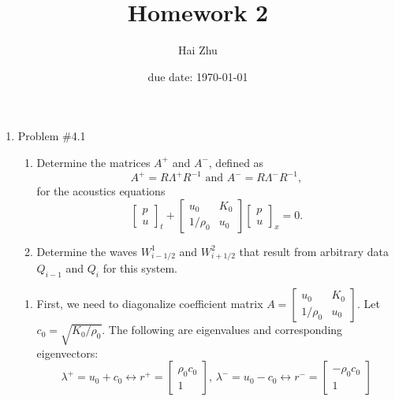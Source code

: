 \documentclass[11pt]{article}
\begin{document}
\title{\Large\bf Homework 2}
\author{Hai Zhu}
\date{due date: \today}
\maketitle
\thispagestyle{fancy}
\renewcommand{\qed}{\hfill \mbox{\raggedright \rule{0.07in}{0.1in}}} %

\begin{enumerate}
    \item Problem \#4.1 
            
			\begin{enumerate}
			
				\item
					Determine the matrices $A^+$ and $A^-$, defined as
					\[
					A^+=R\Lambda^+R^{-1} \text{  and  } 
					A^-=R\Lambda^-R^{-1},
					\]
					for the acoustics equations
					\[
					\begin{bmatrix}
					p\\u
					\end{bmatrix}_t+
					\begin{bmatrix}
					u_0&K_0 \\ 1/\rho_0&u_0
					\end{bmatrix}
					\begin{bmatrix}
					p\\u
					\end{bmatrix}_x=0.
					\]
					
				\item	
					Determine the waves $W_{i-1/2}^1$ and $W_{i+1/2}^2$ that result from arbitrary data $Q_{i-1}$ and $Q_i$ for this system.			

			\end{enumerate}
		
		\vskip 5pt
        \vskip 5pt
        	
        	\begin{enumerate}
        	
				\item
					First, we need to diagonalize coefficient matrix $A=\begin{bmatrix}u_0&K_0\\1/\rho_0&u_0\end{bmatrix}$. Let $c_0=\sqrt{K_0/\rho_0}$. The following are eigenvalues and corresponding eigenvectors:
					\[
					\lambda^+=u_0+c_0 \leftrightarrow 
					r^+=\begin{bmatrix}\rho_0c_0\\1\end{bmatrix} \text{,   } 
					\lambda^-=u_0-c_0 \leftrightarrow 
					r^-=\begin{bmatrix}-\rho_0c_0\\1\end{bmatrix}
					\]  
					 	

\end{enumerate}
\end{enumerate}
\end{document}

